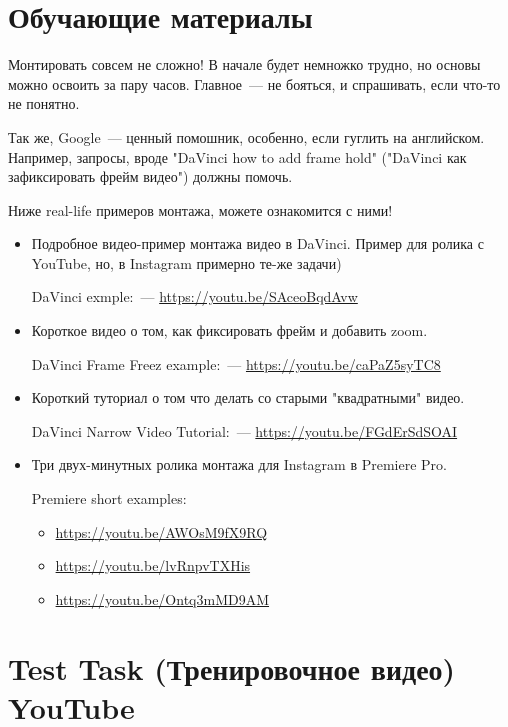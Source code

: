 \documentclass[
a4paper, %
12pt, %
article,
onecolumn, %
openany, %
]{memoir}
\begin{document}
\newpage
\section{Обучающие материалы}

Монтировать совсем не сложно! В начале будет немножко трудно, но основы можно 
освоить за пару часов. Главное~--- не бояться, и спрашивать, если что-то не понятно.

Так же, Google~--- ценный помошник, особенно, если гуглить на английском.
Например, запросы, вроде 
"DaVinci how to add frame hold" ("DaVinci как зафиксировать фрейм видео")
должны помочь.

Ниже real-life примеров монтажа, можете ознакомится с ними!
\begin{itemize}
    \item Подробное видео-пример монтажа видео в DaVinci. 
        Пример для ролика с YouTube, но, в 
        Instagram примерно те-же задачи)
        
        DaVinci exmple:~--- \href{https://youtu.be/SAceoBqdAvw}{https://youtu.be/SAceoBqdAvw}
    \item Короткое видео о том, как фиксировать фрейм и добавить zoom.

        DaVinci Frame Freez example:~--- \href{https://youtu.be/caPaZ5syTC8}{https://youtu.be/caPaZ5syTC8}
    \item Короткий туториал о том что делать со старыми "квадратными" видео. 

        DaVinci Narrow Video Tutorial:~--- \href{https://youtu.be/FGdErSdSOAI}{https://youtu.be/FGdErSdSOAI}

\item Три двух-минутных ролика монтажа для Instagram в Premiere Pro.

    Premiere short examples:
    \begin{itemize}
        \item \href{https://youtu.be/AWOsM9fX9RQ}{https://youtu.be/AWOsM9fX9RQ}
        \item \href{https://youtu.be/lvRnpvTXHis}{https://youtu.be/lvRnpvTXHis}
        \item \href{https://youtu.be/Ontq3mMD9AM}{https://youtu.be/Ontq3mMD9AM}
    \end{itemize}
\end{itemize}




\newpage
\section{Test Task (Тренировочное видео) YouTube}
 
\end{document}

